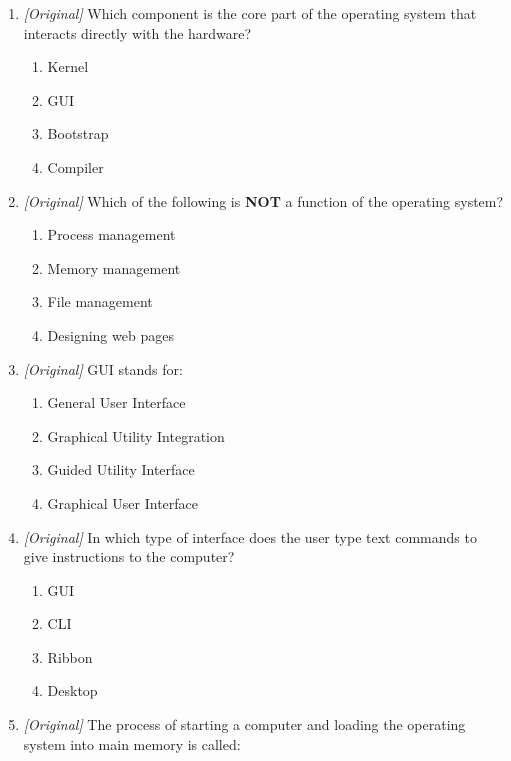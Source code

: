 \documentclass[11pt]{article}
\begin{document}
\begin{enumerate}[label=\textbf{Q\arabic*.}, leftmargin=*]
\begin{enumerate}[label=\Alph*.]
    \item Online Service
    \item Operating System
    \item Output Storage
  \end{enumerate}
\item \textit{[Original]} Which component is the core part of the operating
  system that interacts directly with the hardware?
  \begin{enumerate}[label=\Alph*.]
    \item Kernel
    \item GUI
    \item Bootstrap
    \item Compiler
  \end{enumerate}
\item \textit{[Original]} Which of the following is \textbf{NOT} a function of
  the operating system?
  \begin{enumerate}[label=\Alph*.]
    \item Process management
    \item Memory management
    \item File management
    \item Designing web pages
  \end{enumerate}
\item \textit{[Original]} GUI stands for:
  \begin{enumerate}[label=\Alph*.]
    \item General User Interface
    \item Graphical Utility Integration
    \item Guided Utility Interface
    \item Graphical User Interface
  \end{enumerate}
\item \textit{[Original]} In which type of interface does the user type text
  commands to give instructions to the computer?
  \begin{enumerate}[label=\Alph*.]
    \item GUI
    \item CLI
    \item Ribbon
    \item Desktop
  \end{enumerate}
\item \textit{[Original]} The process of starting a computer and loading the
  operating system into main memory is called:
  \begin{enumerate}[label=\Alph*.]

\end{enumerate}
\end{enumerate}
\end{document}
